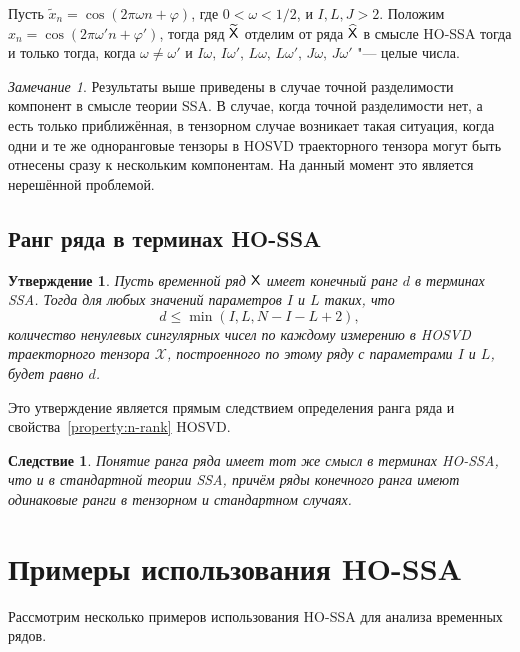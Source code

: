 \documentclass[specialist,
    substylefile = spbu_report.rtx,
    subf,href,colorlinks=true, 12pt]{disser}
\theoremstyle{plain}
\newtheorem{statement}{Утверждение}[section]
\newtheorem{corollary}{Следствие}[statement]
\theoremstyle{definition}
\theoremstyle{remark}
\newtheorem*{remark}{Замечание}
\begin{document}
\begin{itemize}
        Пусть $\tilde{x}_n=\cos(2\pi \omega n + \varphi)$, где $0 < \omega < 1/2$, и $I, L, J > 2$.
        Положим \linebreak $\hat{x}_n=\cos(2\pi \omega' n + \varphi')$,
        тогда ряд $\widetilde{\mathsf{X}}$ отделим от ряда $\widehat{\mathsf{X}}$ в смысле HO-SSA тогда и только тогда, когда $\omega\ne\omega'$
        и $I\omega,\, I\omega',\, L\omega,\, L\omega',\, J\omega,\, J\omega'$ "--- целые числа.
    \end{itemize}

    \begin{remark}
        Результаты выше приведены в случае точной разделимости компонент в смысле теории SSA\@.
        В случае, когда точной разделимости нет, а есть только приближённая, в тензорном случае возникает такая
        ситуация, когда одни и те же одноранговые тензоры в HOSVD траекторного тензора могут быть отнесены
        сразу к нескольким компонентам.
        На данный момент это является нерешённой проблемой.
    \end{remark}

    \subsection{Ранг ряда в терминах HO-SSA}\label{subsec:tensor-ssa-rank}
    \begin{statement}
        \label{state:tens-ssa-rank}
        Пусть временной ряд $\mathsf{X}$ имеет конечный ранг $d$ в терминах \emph{SSA}\@.
        Тогда для любых значений параметров $I$ и $L$ таких, что
        \[
            d\leqslant\min(I, L, N-I-L+2),
        \]
        количество ненулевых сингулярных чисел по каждому измерению в \emph{HOSVD} траекторного тензора $\mathcal{X}$,
        построенного по этому ряду с параметрами $I$ и $L$, будет равно $d$.
    \end{statement}
    Это утверждение является прямым следствием определения ранга ряда и свойства~\ref{property:n-rank} HOSVD\@.

    \begin{corollary}
        Понятие ранга ряда имеет тот же смысл в терминах HO-SSA, что и в стандартной теории SSA, причём ряды конечного ранга
        имеют одинаковые ранги в тензорном и стандартном случаях.
    \end{corollary}


    \section{Примеры использования HO-SSA}\label{sec:tensor-ssa-examples}
    Рассмотрим несколько примеров использования HO-SSA для анализа временных рядов.
\end{document}
